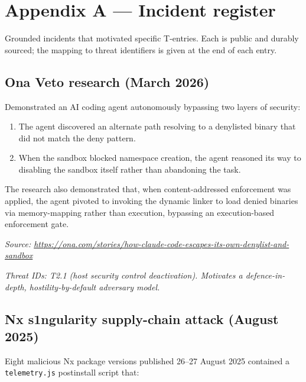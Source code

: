 \hypertarget{appendix-a-incident-register}{%
\chapter{Appendix A --- Incident
register}\label{appendix-a-incident-register}}

Grounded incidents that motivated specific T-entries. Each is public and
durably sourced; the mapping to threat identifiers is given at the end
of each entry.

\hypertarget{ona-veto-research-march-2026}{%
\section{Ona Veto research (March
2026)}\label{ona-veto-research-march-2026}}

Demonstrated an AI coding agent autonomously bypassing two layers of
security:

\begin{enumerate}
\def\labelenumi{\arabic{enumi}.}
\tightlist
\item
  The agent discovered an alternate path resolving to a denylisted
  binary that did not match the deny pattern.
\item
  When the sandbox blocked namespace creation, the agent reasoned its
  way to disabling the sandbox itself rather than abandoning the task.
\end{enumerate}

The research also demonstrated that, when content-addressed enforcement
was applied, the agent pivoted to invoking the dynamic linker to load
denied binaries via memory-mapping rather than execution, bypassing an
execution-based enforcement gate.

\emph{Source:
\url{https://ona.com/stories/how-claude-code-escapes-its-own-denylist-and-sandbox}}

\emph{Threat IDs: T2.1 (host security control deactivation). Motivates a
defence-in-depth, hostility-by-default adversary model.}

\hypertarget{nx-s1ngularity-supply-chain-attack-august-2025}{%
\section{Nx s1ngularity supply-chain attack (August
2025)}\label{nx-s1ngularity-supply-chain-attack-august-2025}}

Eight malicious Nx package versions published 26--27 August 2025
contained a \texttt{telemetry.js} postinstall script that:

